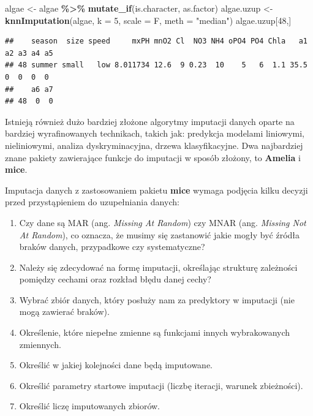 \documentclass[
]{book}
\newenvironment{Shaded}{\begin{snugshade}}{\end{snugshade}}
\newcommand{\AttributeTok}[1]{\textcolor[rgb]{0.13,0.29,0.53}{#1}}
\newcommand{\DecValTok}[1]{\textcolor[rgb]{0.00,0.00,0.81}{#1}}
\newcommand{\FunctionTok}[1]{\textcolor[rgb]{0.13,0.29,0.53}{\textbf{#1}}}
\newcommand{\NormalTok}[1]{#1}
\newcommand{\OtherTok}[1]{\textcolor[rgb]{0.56,0.35,0.01}{#1}}
\newcommand{\SpecialCharTok}[1]{\textcolor[rgb]{0.81,0.36,0.00}{\textbf{#1}}}
\newcommand{\StringTok}[1]{\textcolor[rgb]{0.31,0.60,0.02}{#1}}
\providecommand{\tightlist}{%
  \setlength{\itemsep}{0pt}\setlength{\parskip}{0pt}}
\theoremstyle{plain}
\theoremstyle{definition}
\theoremstyle{definition}
\theoremstyle{definition}
\theoremstyle{definition}
\theoremstyle{definition}
\theoremstyle{remark}
\begin{document}
\begin{Shaded}
\begin{Highlighting}[]
\NormalTok{algae }\OtherTok{\textless{}{-}}\NormalTok{ algae }\SpecialCharTok{\%\textgreater{}\%} 
    \FunctionTok{mutate\_if}\NormalTok{(is.character, as.factor)}
\NormalTok{algae.uzup }\OtherTok{\textless{}{-}} \FunctionTok{knnImputation}\NormalTok{(algae, }\AttributeTok{k =} \DecValTok{5}\NormalTok{, }\AttributeTok{scale =}\NormalTok{ F, }\AttributeTok{meth =} \StringTok{"median"}\NormalTok{)}
\NormalTok{algae.uzup[}\DecValTok{48}\NormalTok{,]}
\end{Highlighting}
\end{Shaded}

\begin{verbatim}
##    season  size speed     mxPH mnO2 Cl  NO3 NH4 oPO4 PO4 Chla   a1 a2 a3 a4 a5
## 48 summer small   low 8.011734 12.6  9 0.23  10    5   6  1.1 35.5  0  0  0  0
##    a6 a7
## 48  0  0
\end{verbatim}

Istnieją również dużo bardziej złożone algorytmy imputacji danych oparte na bardziej wyrafinowanych technikach, takich jak: predykcja modelami liniowymi, nieliniowymi, analiza dyskryminacyjna, drzewa klasyfikacyjne. Dwa najbardziej znane pakiety zawierające funkcje do imputacji w sposób złożony, to \textbf{Amelia} i \textbf{mice}.

Imputacja danych z zastosowaniem pakietu \textbf{mice} wymaga podjęcia kilku decyzji przed przystąpieniem do uzupełniania danych:

\begin{enumerate}
\def\labelenumi{\arabic{enumi}.}
\tightlist
\item
  Czy dane są MAR (ang. \emph{Missing At Random}) czy MNAR (ang. \emph{Missing Not At Random}), co oznacza, że musimy się zastanowić jakie mogły być źródła braków danych, przypadkowe czy systematyczne?
\item
  Należy się zdecydować na formę imputacji, określając strukturę zależności pomiędzy cechami oraz rozkład błędu danej cechy?
\item
  Wybrać zbiór danych, który posłuży nam za predyktory w imputacji (nie mogą zawierać braków).
\item
  Określenie, które niepełne zmienne są funkcjami innych wybrakowanych zmiennych.
\item
  Określić w jakiej kolejności dane będą imputowane.
\item
  Określić parametry startowe imputacji (liczbę iteracji, warunek zbieżności).
\item
  Określić liczę imputowanych zbiorów.
\end{enumerate}
\end{document}

